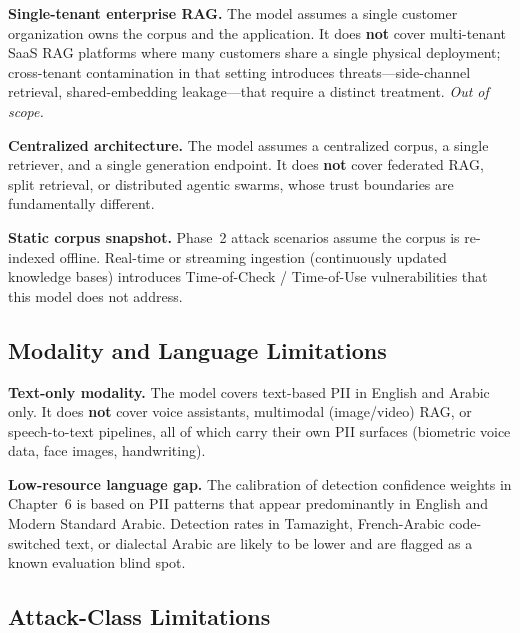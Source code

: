 \documentclass[12pt, a4paper]{report}
\begin{document}
\begin{limitbox}
\textbf{Single-tenant enterprise RAG.} The model assumes a single customer
organization owns the corpus and the application. It does \textbf{not}
cover multi-tenant SaaS RAG platforms where many customers share a single
physical deployment; cross-tenant contamination in that setting introduces
threats---side-channel retrieval, shared-embedding leakage---that require
a distinct treatment. \emph{Out of scope.}

\textbf{Centralized architecture.} The model assumes a centralized
corpus, a single retriever, and a single generation endpoint. It does
\textbf{not} cover federated RAG, split retrieval, or distributed
agentic swarms, whose trust boundaries are fundamentally different.

\textbf{Static corpus snapshot.} Phase~2 attack scenarios assume the
corpus is re-indexed offline. Real-time or streaming ingestion
(continuously updated knowledge bases) introduces Time-of-Check /
Time-of-Use vulnerabilities that this model does not address.
\end{limitbox}

\subsection{Modality and Language Limitations}

\begin{limitbox}
\textbf{Text-only modality.} The model covers text-based PII in English
and Arabic only. It does \textbf{not} cover voice assistants, multimodal
(image/video) RAG, or speech-to-text pipelines, all of which carry their
own PII surfaces (biometric voice data, face images, handwriting).

\textbf{Low-resource language gap.} The calibration of detection
confidence weights in Chapter~6 is based on PII patterns that appear
predominantly in English and Modern Standard Arabic. Detection rates in
Tamazight, French-Arabic code-switched text, or dialectal Arabic are
likely to be lower and are flagged as a known evaluation blind spot.
\end{limitbox}

\subsection{Attack-Class Limitations}
\end{document}
